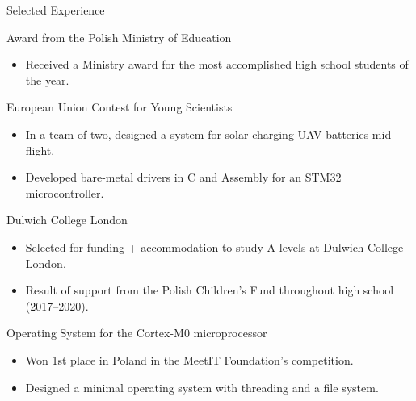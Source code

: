 \documentclass{article}
\newlength{\tabin}
\newlength{\secsep}
\newcommand{\lineunder}{\vspace*{-8pt} \\ \hspace*{-6pt} \hrulefill \\ \vspace*{-15pt}}
\newenvironment{tabbedsection}[1]{
  \begin{list}{}{
      \setlength{\itemsep}{0pt}
      \setlength{\labelsep}{0pt}
      \setlength{\labelwidth}{0pt}
      \setlength{\leftmargin}{\tabin}
      \setlength{\rightmargin}{\tabin}
      \setlength{\listparindent}{0pt}
      \setlength{\parsep}{0pt}
      \setlength{\parskip}{0pt}
      \setlength{\partopsep}{0pt}
      \setlength{\topsep}{#1}
    }
  \item[]
}{\end{list}}
\newenvironment{nospacetabbing}{
    \begin{tabbing}
}{\end{tabbing}\vspace{-1.2em}}
\newenvironment{resume_section}[1]{
  \filbreak
  \vspace{2\secsep}
  \textsc{\large#1}
  \lineunder
  \begin{tabbedsection}{\secsep}
}{\end{tabbedsection}}
\newenvironment{resume_subsection}[2][]{
  \textbf{#2} \hfill {\footnotesize #1}%
  \begin{tabbedsection}{0.5\secsep}
}{\end{tabbedsection}}
\newenvironment{subitems}{
  \renewcommand{\labelitemi}{-}
  \begin{itemize}
      \setlength{\labelsep}{1em}
}{\end{itemize}}
\begin{document}
\begin{resume_section}{Selected Experience}
  \begin{resume_subsection}[July 2020]{Award from the Polish Ministry of Education}
    \begin{subitems}
      \item Received a Ministry award for the most accomplished high school students of the year.
    \end{subitems}
  \end{resume_subsection}

  \begin{resume_subsection}{European Union Contest for Young Scientists}
    \begin{subitems}
      \item In a team of two, designed a system for solar charging UAV batteries mid-flight.
      \item Developed bare-metal drivers in C and Assembly for an STM32 microcontroller.
    \end{subitems}
  \end{resume_subsection}

  \begin{resume_subsection}{Dulwich College London}
    \begin{subitems}
      \item Selected for funding + accommodation to study A-levels at Dulwich College London.
      \item Result of support from the Polish Children's Fund throughout high school (2017--2020).
    \end{subitems}
  \end{resume_subsection}

  \begin{resume_subsection}{Operating System for the Cortex-M0 microprocessor}
    \begin{subitems}
      \item Won 1st place in Poland in the MeetIT Foundation's competition.
      \item Designed a minimal operating system with threading and a file system.
    \end{subitems}
  \end{resume_subsection}

\end{resume_section}


\end{document}

